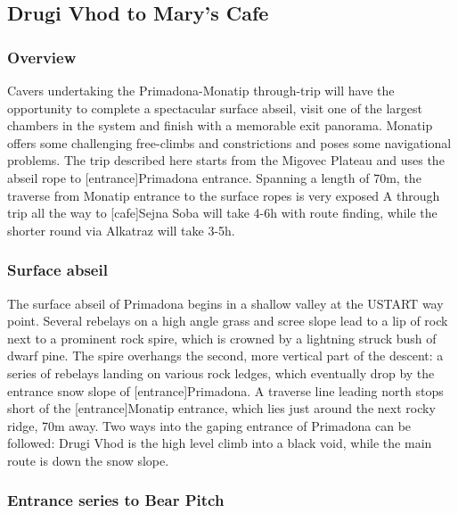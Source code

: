 \hypertarget{drugi-vhod-to-marys-cafe}{%
\subsection{Drugi Vhod to Mary's Cafe}\label{drugi-vhod-to-marys-cafe}}

\hypertarget{overview}{%
\subsubsection{Overview}\label{overview}}

Cavers undertaking the Primadona-Monatip through-trip will have the opportunity to complete a spectacular surface abseil, visit one of the largest chambers in the system and finish with a memorable exit panorama. Monatip offers some challenging free-climbs and constrictions and poses some navigational problems. The trip described here starts from the Migovec Plateau and uses the abseil rope to {[}entrance{]}Primadona entrance. Spanning a length of 70m, the traverse from Monatip entrance to the surface ropes is very exposed A through trip all the way to {[}cafe{]}Sejna Soba will take 4-6h with route finding, while the shorter round via Alkatraz will take 3-5h.

\hypertarget{surface-abseil}{%
\subsubsection{Surface abseil}\label{surface-abseil}}

The surface abseil of Primadona begins in a shallow valley at the USTART way point. Several rebelays on a high angle grass and scree slope lead to a lip of rock next to a prominent rock spire, which is crowned by a lightning struck bush of dwarf pine. The spire overhangs the second, more vertical part of the descent: a series of rebelays landing on various rock ledges, which eventually drop by the entrance snow slope of {[}entrance{]}Primadona. A traverse line leading north stops short of the {[}entrance{]}Monatip entrance, which lies just around the next rocky ridge, 70m away. Two ways into the gaping entrance of Primadona can be followed: Drugi Vhod is the high level climb into a black void, while the main route is down the snow slope.

\hypertarget{entrance-series-to-bear-pitch}{%
\subsubsection{Entrance series to Bear Pitch}\label{entrance-series-to-bear-pitch}}


